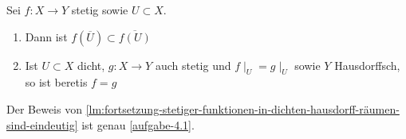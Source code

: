 \begin{lemma}\label{lm:fortsetzung-stetiger-funktionen-in-dichten-hausdorff-räumen-sind-eindeutig}
   Sei $f: X \to  Y$ stetig sowie $U\subset X$.
   \begin{enumerate}[1)]
       \item Dann ist $f(\overline{U}) \subset \overline{f(U)}$ 
       \item Ist $U\subset X$ dicht, $g: X\to Y$ auch stetig und $f\mid _ U = g\mid _U$ sowie $Y$ Hausdorffsch, so ist beretis  $f=g$
   \end{enumerate}
\end{lemma}

\begin{remark*}
    Der Beweis von \autoref{lm:fortsetzung-stetiger-funktionen-in-dichten-hausdorff-räumen-sind-eindeutig} ist genau \autoref{aufgabe-4.1}.
\end{remark*}

